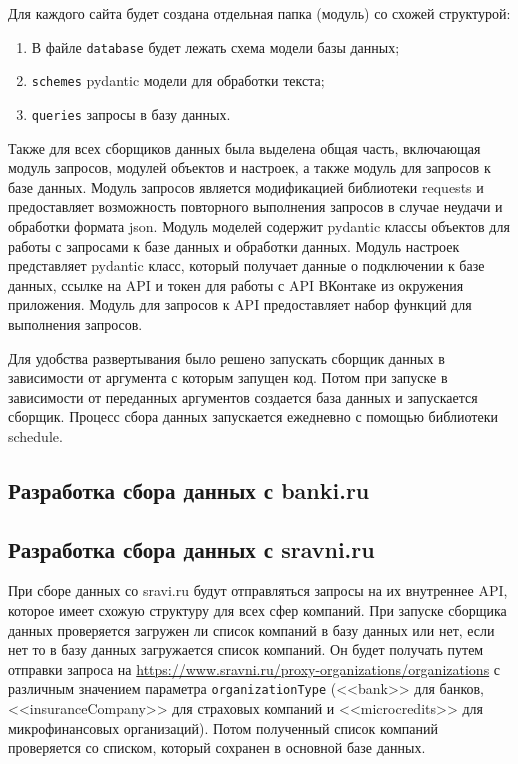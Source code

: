 \documentclass[PI, VKR]{HSEUniversity}
\begin{document}
Для каждого сайта будет создана отдельная папка (модуль) со схожей структурой:
\begin{enumerate}
\item В файле \texttt{database} будет лежать схема модели базы данных;
\item \texttt{schemes} pydantic модели для обработки текста;
\item \texttt{queries} запросы в базу данных.
\end{enumerate}

Также для всех сборщиков данных была выделена общая часть, включающая модуль запросов, модулей объектов и настроек, а также модуль для запросов к базе данных. Модуль запросов является модификацией библиотеки requests \autocite{chandra_python_2015} и предоставляет возможность повторного выполнения запросов в случае неудачи и обработки формата json. Модуль моделей содержит pydantic классы объектов для работы с запросами к базе данных и обработки данных. Модуль настроек представляет pydantic класс, который получает данные о подключении к базе данных, ссылке на API и токен для работы с API ВКонтаке из окружения приложения. Модуль для запросов к API предоставляет набор функций для выполнения запросов.

Для удобства развертывания было решено запускать сборщик данных в зависимости от аргумента с которым запущен код. Потом при запуске в зависимости от переданных аргументов создается база данных и запускается сборщик. Процесс сбора данных запускается ежедневно с помощью библиотеки schedule.

\subsection{Разработка сбора данных с banki.ru}
\label{sec:org6479bac}

\subsection{Разработка сбора данных с sravni.ru}
\label{sec:org01eed0d}
При сборе данных со sravi.ru будут отправляться запросы на их внутреннее API, которое имеет схожую структуру для всех сфер компаний. При запуске сборщика данных проверяется загружен ли список компаний в базу данных или нет, если нет то в базу данных загружается список компаний. Он будет получать путем отправки запроса на \url{https://www.sravni.ru/proxy-organizations/organizations} с различным значением параметра \texttt{organizationType} ({}<<bank>>{} для банков, {}<<insuranceCompany>>{} для страховых компаний и {}<<microcredits>>{} для микрофинансовых организаций). Потом полученный список компаний проверяется со списком, который сохранен в основной базе данных.
\end{document}
